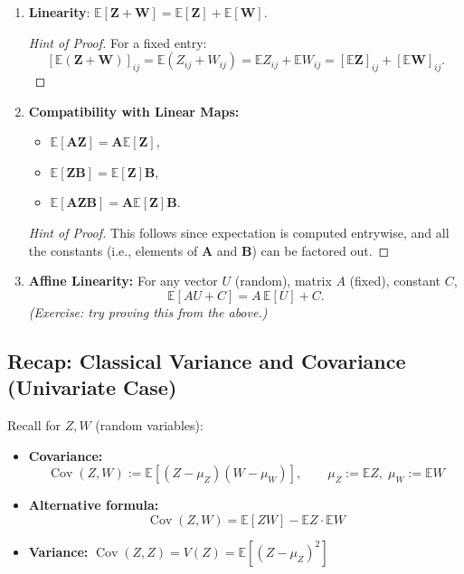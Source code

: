 \documentclass[12pt]{article}
\begin{document}
\begin{enumerate}[label=\arabic*.]
    \item \textbf{Linearity}: $\mathbb{E}[\boldsymbol{Z} + \boldsymbol{W}] = \mathbb{E}[\boldsymbol{Z}] + \mathbb{E}[\boldsymbol{W}]$.

      \begin{proof}[Hint of Proof]
      For a fixed entry:
      \[
        [\mathbb{E}(\boldsymbol{Z}+\boldsymbol{W})]_{ij} = \mathbb{E}(Z_{ij} + W_{ij}) = \mathbb{E} Z_{ij} + \mathbb{E} W_{ij} = [\mathbb{E} \boldsymbol{Z}]_{ij} + [\mathbb{E} \boldsymbol{W}]_{ij}.
      \]
      \end{proof}
    \item \textbf{Compatibility with Linear Maps:} 
      \begin{itemize}
          \item $\mathbb{E}[\boldsymbol{A}\boldsymbol{Z}] = \boldsymbol{A}\mathbb{E}[\boldsymbol{Z}]$,
          \item $\mathbb{E}[\boldsymbol{Z}\boldsymbol{B}] = \mathbb{E}[\boldsymbol{Z}]\boldsymbol{B}$,
          \item $\mathbb{E}[\boldsymbol{A}\boldsymbol{Z}\boldsymbol{B}] = \boldsymbol{A} \mathbb{E}[\boldsymbol{Z}] \boldsymbol{B}$.
      \end{itemize}

      \begin{proof}[Hint of Proof]
      This follows since expectation is computed entrywise, and all the constants (i.e., elements of $\boldsymbol{A}$ and $\boldsymbol{B}$) can be factored out.
      \end{proof}
    \item \textbf{Affine Linearity:} For any vector $U$ (random), matrix $A$ (fixed), constant $C$, 
    \[
    \mathbb{E}[A U + C] = A \, \mathbb{E}[U] + C.
    \]
    \emph{(Exercise: try proving this from the above.)}
\end{enumerate}

\subsection{Recap: Classical Variance and Covariance (Univariate Case)}

Recall for $Z, W$ (random variables):
\begin{itemize}
    \item \textbf{Covariance:}
    \[
        \operatorname{Cov}(Z, W) := \mathbb{E}\left[ (Z - \mu_Z)(W - \mu_W) \right], \qquad \mu_Z := \mathbb{E}Z, \; \mu_W := \mathbb{E}W
    \]
    \item \textbf{Alternative formula:}
    \[
        \operatorname{Cov}(Z, W) = \mathbb{E}[Z W] - \mathbb{E}Z \cdot \mathbb{E}W
    \]
    \item \textbf{Variance:} $\operatorname{Cov}(Z, Z) = V(Z) = \mathbb{E}\left[(Z-\mu_Z)^2\right]$
\end{itemize}
\end{document}
